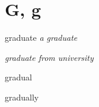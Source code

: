 \section{G, g}

\begin{DefWord}{graduate}
    \textit{a graduate}

    \textit{graduate from university}
\end{DefWord}

\begin{DefWord}{gradual}
\end{DefWord}

\begin{DefWord}{gradually}
\end{DefWord}
